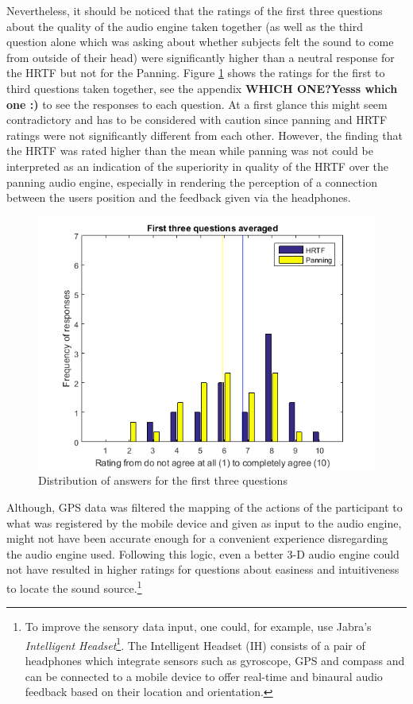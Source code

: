 \documentclass[journal]{IEEEtran}
\begin{document}
Nevertheless, it should be noticed that the ratings of the first three questions about the quality of the audio engine taken together (as well as the third question alone which was asking about whether subjects felt the sound to come from outside of their head) were significantly higher than a neutral response for the HRTF but not for the Panning. Figure \ref{fig:histqq13} shows the ratings for the first to third questions taken together, see the appendix \textbf{WHICH ONE?Yesss which one :)} to see the responses to each question. At a first glance this might seem contradictory and has to be considered with caution since panning and HRTF ratings were not significantly different from each other. However, the finding that the HRTF was rated higher than the mean while panning was not could be interpreted as an indication of the superiority in quality of the HRTF over the panning audio engine, especially in rendering the perception of a connection between the users position and the feedback given via the headphones. 

\begin{figure}[h!]
\centering
\includegraphics[scale=0.7]{graphics/qq13.png}
\caption{Distribution of answers for the first three questions}
\label{fig:histqq13}
\end{figure}

Although, GPS data was filtered the mapping of the actions of the participant to what was registered by the mobile device and given as input to the audio engine, might not have been accurate enough for a convenient experience disregarding the audio engine used. Following this logic, even a better 3-D audio engine could not have resulted in higher ratings for questions about easiness and intuitiveness to locate the sound source.\footnote{ To improve the sensory data input, one could, for example, use Jabra's \emph{Intelligent Headset}\footnote{https://intelligentheadset.com/}. The Intelligent Headset (IH) consists of a pair of headphones which integrate sensors such as gyroscope, GPS and compass and can be connected to a mobile device to offer real-time and binaural audio feedback based on their location and orientation.}
\end{document}
